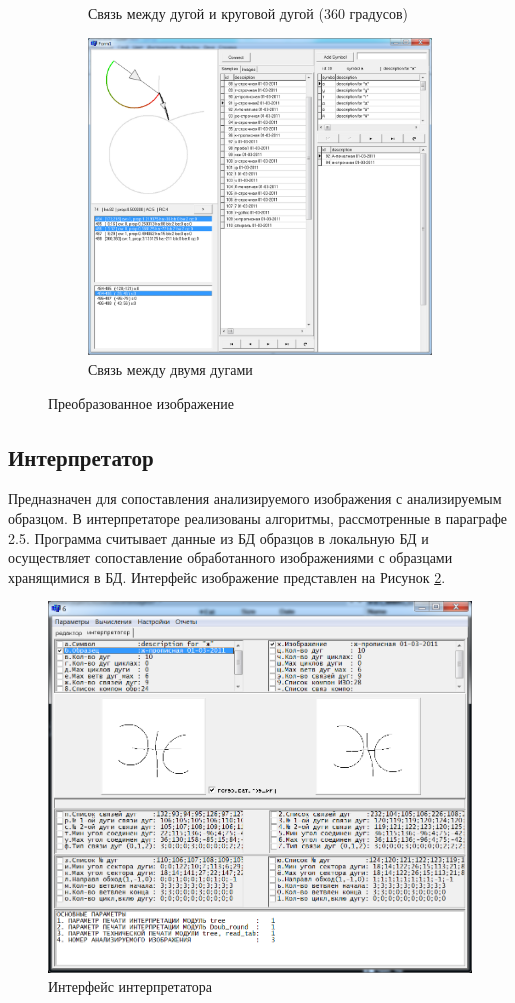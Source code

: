 \begin{figure}[h]
\begin{subfigure}{.5\textwidth}
		\caption{Связь между дугой и круговой дугой (360 градусов)}
	\end{subfigure}
	\begin{subfigure}{1\textwidth}
			\centering
			\includegraphics[width=.45\linewidth]{images/an_preview_3}
			\caption{Связь между двумя дугами}
	\end{subfigure}
	\caption{Преобразованное изображение}
	\label{an:preview}
\end{figure}


\subsection{Интерпретатор}
Предназначен для сопоставления анализируемого изображения с анализируемым образцом. В интерпретаторе реализованы алгоритмы, рассмотренные в параграфе 2.5.
Программа считывает данные из БД образцов в локальную БД и осуществляет сопоставление обработанного изображениями с образцами хранящимися в БД. Интерфейс изображение представлен на Рисунок \ref{an:analyze}.

\begin{figure}[h]
	\centering
	\includegraphics[scale=0.25]{images/an_convertor_analyze}
	\caption{Интерфейс интерпретатора}
	\label{an:analyze}
\end{figure}

